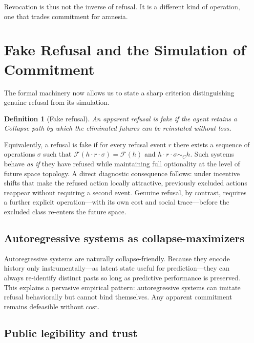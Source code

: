 \documentclass[11pt]{article}
\newtheorem{definition}{Definition}
\begin{document}
Revocation is thus not the inverse of refusal. It is a different kind of
operation, one that trades commitment for amnesia.

\section{Fake Refusal and the Simulation of Commitment}

The formal machinery now allows us to state a sharp criterion distinguishing
genuine refusal from its simulation.

\begin{definition}[Fake refusal]
An apparent refusal is fake if the agent retains a Collapse path by which the
eliminated futures can be reinstated without loss.
\end{definition}

Equivalently, a refusal is fake if for every refusal event $r$ there exists a
sequence of operations $\sigma$ such that
$\mathcal{F}(h \cdot r \cdot \sigma) = \mathcal{F}(h)$ and
$h \cdot r \cdot \sigma \sim_C h$. Such systems behave \emph{as if} they have
refused while maintaining full optionality at the level of future space topology.
A direct diagnostic consequence follows: under incentive shifts that make the
refused action locally attractive, previously excluded actions reappear without
requiring a second event. Genuine refusal, by contrast, requires a further
explicit operation---with its own cost and social trace---before the excluded
class re-enters the future space.

\subsection{Autoregressive systems as collapse-maximizers}

Autoregressive systems are naturally collapse-friendly. Because they encode
history only instrumentally---as latent state useful for prediction---they can
always re-identify distinct pasts so long as predictive performance is
preserved. This explains a pervasive empirical pattern: autoregressive systems
can imitate refusal behaviorally but cannot bind themselves. Any apparent
commitment remains defeasible without cost.

\subsection{Public legibility and trust}
\end{document}
